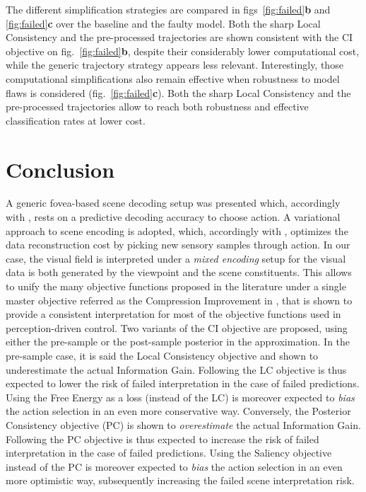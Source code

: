 \documentclass[12pt,twoside,openright]{article}
\begin{document}
The different simplification strategies are compared in figs~\ref{fig:failed}\textbf{b} and \ref{fig:failed}\textbf{c} over the baseline and the faulty model. Both the sharp Local Consistency and the pre-processed trajectories are shown consistent with the CI objective on fig.~\ref{fig:failed}\textbf{b}, despite their considerably lower computational cost, while the generic trajectory strategy appears less relevant. Interestingly, those computational simplifications also remain effective when robustness to model flaws is considered (fig.~\ref{fig:failed}\textbf{c}). 
Both the sharp Local Consistency and the pre-processed trajectories allow to reach both robustness and effective classification rates at lower cost.


\section{Conclusion}
A generic fovea-based scene decoding setup was presented which, accordingly with \citep{najemnik2005optimal}, rests on a predictive decoding accuracy to choose action. A variational approach to scene encoding is adopted, which, accordingly with \citep{friston2012perceptions}, optimizes the data reconstruction cost by picking new sensory samples through action. In our case, the visual field is interpreted under a \emph{mixed encoding} setup for the visual data is both generated by the viewpoint and the scene constituents. 
This allows to unify the many objective functions proposed in the literature under a single master objective referred as the Compression Improvement in \citep{schmidhuber2007simple}, that is shown to provide a consistent interpretation for most of the objective functions used in perception-driven control. Two variants of the CI objective are proposed, using either the pre-sample or the post-sample posterior in the approximation. In the pre-sample case, it is said the Local Consistency objective and shown to underestimate the actual Information Gain. Following the LC objective is thus expected to lower the risk of failed interpretation in the case of failed predictions. Using the Free Energy \citep{friston2015active} as a loss (instead of the LC) is moreover expected to \emph{bias} the action selection in an even more conservative way. 
Conversely, the Posterior Consistency objective (PC) is shown to \emph{overestimate} the actual Information Gain. Following the PC objective is thus expected to increase the risk of failed interpretation in the case of failed predictions. 
Using the Saliency objective \citep{itti2005bayesian} instead of the PC is moreover expected to \emph{bias} the action selection in an even more optimistic way, subsequently increasing the failed scene interpretation risk.
\end{document}
